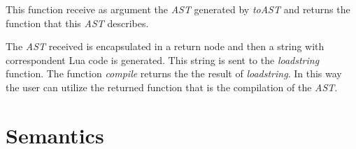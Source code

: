 \documentclass[english]{llncs}
\begin{document}
This function receive as argument the \emph{AST} generated by \emph{toAST} and returns the function that this \emph{AST} describes.

The \emph{AST} received is encapsulated in a return node and then a string with correspondent Lua code is generated.
This string is sent to the \emph{loadstring} function.
The function \emph{compile} returns the the result of \emph{loadstring}.
In this way the user can utilize the returned function that is the compilation of the \emph{AST}.




\section{Semantics}

\label{sec:evaluation_semantics}

\end{document}
